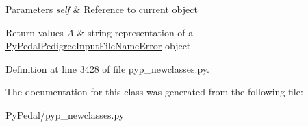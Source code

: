 \begin{DoxyParams}{Parameters}
{\em self} & Reference to current object \\
\hline
\end{DoxyParams}

\begin{DoxyRetVals}{Return values}
{\em A} & string representation of a \hyperlink{classPyPedal_1_1pyp__newclasses_1_1PyPedalPedigreeInputFileNameError}{PyPedalPedigreeInputFileNameError} object \\
\hline
\end{DoxyRetVals}


Definition at line 3428 of file pyp\_\-newclasses.py.



The documentation for this class was generated from the following file:\begin{DoxyCompactItemize}
\item 
PyPedal/pyp\_\-newclasses.py\end{DoxyCompactItemize}
